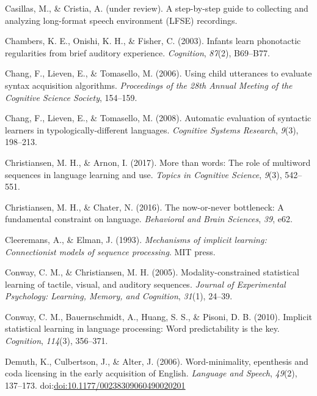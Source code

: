 \documentclass[man,mask,floatsintext]{apa6}
\begin{document}
\hypertarget{ref-casillasURstep}{}
Casillas, M., \& Cristia, A. (under review). A step-by-step guide to
collecting and analyzing long-format speech environment (LFSE)
recordings.

\hypertarget{ref-chambers2003infants}{}
Chambers, K. E., Onishi, K. H., \& Fisher, C. (2003). Infants learn
phonotactic regularities from brief auditory experience.
\emph{Cognition}, \emph{87}(2), B69--B77.

\hypertarget{ref-chang2006using}{}
Chang, F., Lieven, E., \& Tomasello, M. (2006). Using child utterances
to evaluate syntax acquisition algorithms. \emph{Proceedings of the 28th
Annual Meeting of the Cognitive Science Society}, 154--159.

\hypertarget{ref-chang2008automatic}{}
Chang, F., Lieven, E., \& Tomasello, M. (2008). Automatic evaluation of
syntactic learners in typologically-different languages. \emph{Cognitive
Systems Research}, \emph{9}(3), 198--213.

\hypertarget{ref-christiansen2017more}{}
Christiansen, M. H., \& Arnon, I. (2017). More than words: The role of
multiword sequences in language learning and use. \emph{Topics in
Cognitive Science}, \emph{9}(3), 542--551.

\hypertarget{ref-christiansen2016now}{}
Christiansen, M. H., \& Chater, N. (2016). The now-or-never bottleneck:
A fundamental constraint on language. \emph{Behavioral and Brain
Sciences}, \emph{39}, e62.

\hypertarget{ref-cleeremans1993mechanisms}{}
Cleeremans, A., \& Elman, J. (1993). \emph{Mechanisms of implicit
learning: Connectionist models of sequence processing}. MIT press.

\hypertarget{ref-conway2005modality}{}
Conway, C. M., \& Christiansen, M. H. (2005). Modality-constrained
statistical learning of tactile, visual, and auditory sequences.
\emph{Journal of Experimental Psychology: Learning, Memory, and
Cognition}, \emph{31}(1), 24--39.

\hypertarget{ref-conway2010implicit}{}
Conway, C. M., Bauernschmidt, A., Huang, S. S., \& Pisoni, D. B. (2010).
Implicit statistical learning in language processing: Word
predictability is the key. \emph{Cognition}, \emph{114}(3), 356--371.

\hypertarget{ref-demuth2006word}{}
Demuth, K., Culbertson, J., \& Alter, J. (2006). Word-minimality,
epenthesis and coda licensing in the early acquisition of English.
\emph{Language and Speech}, \emph{49}(2), 137--173.
doi:\href{https://doi.org/doi:10.1177/00238309060490020201}{doi:10.1177/00238309060490020201}
\end{document}
